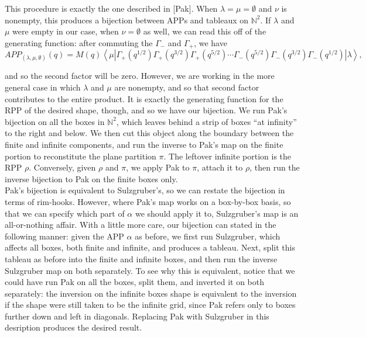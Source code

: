 \begin{Proof}
	This procedure is exactly the one described in [Pak]. When $\lambda = \mu = \emptyset$ and $\nu$ is nonempty, this produces a bijection between APPs and tableaux on $\mathbb{N}^2$. If $\lambda$ and $\mu$ were empty in our case, when $\nu = \emptyset$ as well, we can read this off of the generating function: after commuting the $\Gamma_-$ and $\Gamma_+$, we have
	$$
		APP_{(\lambda, \mu, \emptyset)}(q) = M(q) \left< \mu \left| \Gamma_+\left(q^{1/2}\right) \Gamma_+\left(q^{3/2}\right) \Gamma_+\left(q^{5/2}\right) \cdots \Gamma_-\left(q^{5/2}\right) \Gamma_-\left(q^{3/2}\right) \Gamma_-\left(q^{1/2}\right) \right| \lambda \right>,
	$$
	
	and so the second factor will be zero. However, we are working in the more general case in which $\lambda$ and $\mu$ are nonempty, and so that second factor contributes to the entire product. It is exactly the generating function for the RPP of the desired shape, though, and so we have our bijection. We run Pak's bijection on all the boxes in $\mathbb{N}^2$, which leaves behind a strip of boxes ``at infinity'' to the right and below. We then cut this object along the boundary between the finite and infinite components, and run the inverse to Pak's map on the finite portion to reconstitute the plane partition $\pi$. The leftover infinite portion is the RPP $\rho$. Conversely, given $\rho$ and $\pi$, we apply Pak to $\pi$, attach it to $\rho$, then run the inverse bijection to Pak on the finite boxes only.\\
	
	Pak's bijection is equivalent to Sulzgruber's, so we can restate the bijection in terms of rim-hooks. However, where Pak's map works on a box-by-box basis, so that we can specify which part of $\alpha$ we should apply it to, Sulzgruber's map is an all-or-nothing affair. With a little more care, our bijection can stated in the following manner: given the APP $\alpha$ as before, we first run Sulzgruber, which affects all boxes, both finite and infinite, and produces a tableau. Next, split this tableau as before into the finite and infinite boxes, and then run the inverse Sulzgruber map on both separately. To see why this is equivalent, notice that we could have run Pak on all the boxes, split them, and inverted it on both separately: the inversion on the infinite boxes shape is equivalent to the inversion if the shape were still taken to be the infinite grid, since Pak refers only to boxes further down and left in diagonals. Replacing Pak with Sulzgruber in this desription produces the desired result. \hfill \qedsymbol
	
\end{Proof}



